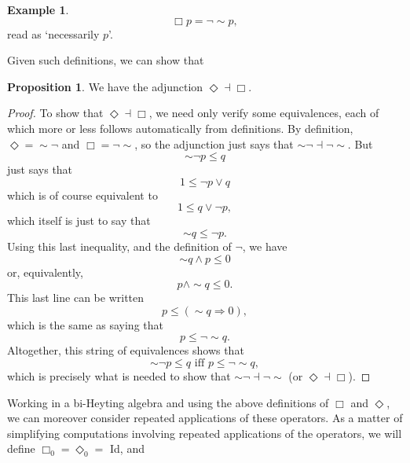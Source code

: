 \documentclass[11pt]{book}
\theoremstyle{definition}
\newtheorem{example}{Example}[section]
\theoremstyle{definition}
\theoremstyle{definition}
\newtheorem{proposition}{Proposition}[section]
\theoremstyle{theorem}
\theoremstyle{definition}
\begin{document}
\begin{example}
	\begin{equation*} 
	\Box p = \neg \sim p,
	\end{equation*} read as `necessarily $p$'. \par 
	Given such definitions, we can show that
	\begin{proposition}
		We have the adjunction $\Diamond \dashv \Box$. 
	\end{proposition} 
	\begin{proof}
		To show that $\Diamond \dashv \Box$, we need only verify some equivalences, each of which more or less follows automatically from definitions. By definition, $\Diamond = \sim \neg$ and $\Box = \neg \sim$, so the adjunction just says that $\sim \neg \dashv \neg \sim$. But 
		\begin{equation*}
		\sim \neg p \leq q
		\end{equation*}
		just says that 
		\begin{equation*}
		1 \leq \neg p \vee q
		\end{equation*}
		which is of course equivalent to 
		\begin{equation*}
		1 \leq q \vee \neg p, 
		\end{equation*}
		which itself is just to say that 
		\begin{equation*}
		\sim q \leq \neg p.
		\end{equation*}
		Using this last inequality, and the definition of $\neg$, we have 
		\begin{equation*}
		\sim q \wedge p \leq 0
		\end{equation*}
		or, equivalently, 
		\begin{equation*}
		p \wedge \sim q \leq 0. 
		\end{equation*}
		This last line can be written 
		\begin{equation*}
		p \leq (\sim q \Rightarrow 0),
		\end{equation*}
		which is the same as saying that 
		\begin{equation*}
		p \leq \neg \sim q. 
		\end{equation*}
		Altogether, this string of equivalences shows that 
		\begin{equation}
		\sim \neg p \leq q \text{ iff } p \leq \neg \sim q,
		\end{equation}
		which is precisely what is needed to show that $\sim \neg \dashv \neg \sim$ (or $\Diamond \dashv \Box$). 
	\end{proof}
	Working in a bi-Heyting algebra and using the above definitions of $\Box$ and $\Diamond$, we can moreover consider repeated applications of these operators. As a matter of simplifying computations involving repeated applications of the operators, we will define $\Box_0 = \Diamond_0 = $ Id, and

\end{example}
\end{document}
